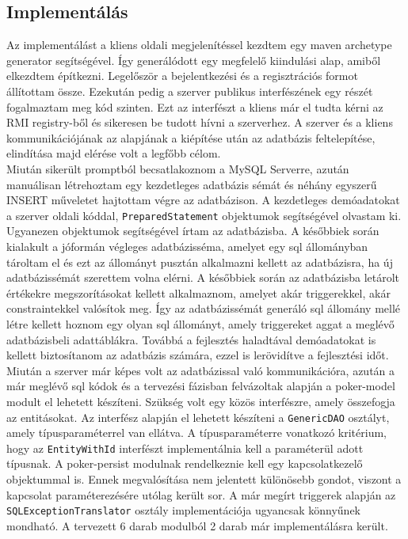 \subsection{Implementálás}
Az implementálást a kliens oldali megjelenítéssel kezdtem egy maven archetype generator segítségével. Így generálódott egy megfelelő kiindulási alap, amiből elkezdtem építkezni. Legelőször a bejelentkezési és a regisztrációs formot állítottam össze. Ezekután pedig a szerver publikus interfészének egy részét fogalmaztam meg kód szinten. Ezt az interfészt a kliens már el tudta kérni az RMI registry-ből \cite{RMI} és sikeresen be tudott hívni a szerverhez. A szerver és a kliens kommunikációjának az alapjának a kiépítése után az adatbázis feltelepítése, elindítása majd elérése volt a legfőbb célom. \\
Miután sikerült promptból becsatlakoznom a MySQL Serverre, azután manuálisan létrehoztam egy kezdetleges adatbázis sémát és néhány egyszerű INSERT műveletet hajtottam végre az adatbázison. A kezdetleges demóadatokat a szerver oldali kóddal, \texttt{PreparedStatement} objektumok segítségével olvastam ki. Ugyanezen objektumok segítségével írtam az adatbázisba. A későbbiek során kialakult a jóformán végleges adatbázisséma, amelyet egy sql állományban tároltam el és ezt az állományt pusztán alkalmazni kellett az adatbázisra, ha új adatbázissémát szerettem volna elérni. A későbbiek során az adatbázisba letárolt értékekre megszorításokat kellett alkalmaznom, amelyet akár triggerekkel, akár constraintekkel valósítok meg. Így az adatbázissémát generáló sql állomány mellé létre kellett hoznom egy olyan sql állományt, amely triggereket aggat a meglévő adatbázisbeli adattáblákra. Továbbá a fejlesztés haladtával demóadatokat is kellett biztosítanom az adatbázis számára, ezzel is lerövidítve a fejlesztési időt. \\
Miután a szerver már képes volt az adatbázissal való kommunikációra, azután a már meglévő sql kódok és a tervezési fázisban felvázoltak alapján a poker-model modult el lehetett készíteni. Szükség volt egy közös interfészre, amely összefogja az entitásokat. Az interfész alapján el lehetett készíteni a \texttt{GenericDAO} osztályt, amely típusparaméterrel van ellátva. A típusparaméterre vonatkozó kritérium, hogy az \texttt{EntityWithId} interfészt implementálnia kell a paraméterül adott típusnak. A poker-persist modulnak rendelkeznie kell egy kapcsolatkezelő objektummal is. Ennek megvalósítása nem jelentett különösebb gondot, viszont a kapcsolat paraméterezésére utólag került sor. A már megírt triggerek alapján az \texttt{SQLExceptionTranslator} osztály implementációja ugyancsak könnyűnek mondható. A tervezett 6 darab modulból 2 darab már implementálásra került. \\

